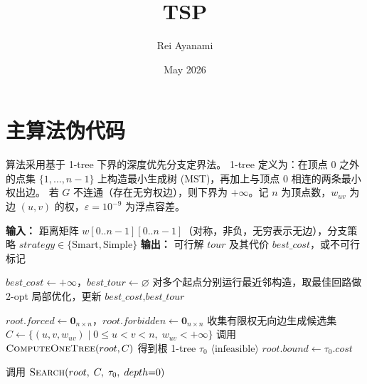 \documentclass{article}
\title{TSP}
\author{Rei Ayanami}
\date{May 2026}
\newenvironment{overflow}
  {\tcolorbox[breakable, colback=white, colframe=black, boxrule=0.5pt, arc=0pt,
              left=2pt, right=2pt, top=2pt, bottom=2pt]}
  {\endtcolorbox}
\begin{document}
\maketitle

\section{主算法伪代码}

算法采用基于 1-tree 下界的深度优先分支定界法。
1-tree 定义为：在顶点 $0$ 之外的点集 $\{1,\dots,n-1\}$ 上构造最小生成树 (MST)，再加上与顶点 $0$ 相连的两条最小权出边。
若 $G$ 不连通（存在无穷权边），则下界为 $+\infty$。记 $n$ 为顶点数，$w_{uv}$ 为边 $(u,v)$ 的权，$\varepsilon = 10^{-9}$ 为浮点容差。

\begin{overflow}
\begin{algorithm}[H]
\caption{基于 1-tree 下界的 DFS 分支定界 (BranchBoundSolver::solve)}
\label{alg:tsp-bb}
\begin{algorithmic}[1]

\State \textbf{输入：} 距离矩阵 $w[0..n{-}1][0..n{-}1]$（对称，非负，无穷表示无边），分支策略 $strategy \in \{\text{Smart}, \text{Simple}\}$
\State \textbf{输出：} 可行解 $\textit{tour}$ 及其代价 $\textit{best\_cost}$，或不可行标记

\Statex

\State $\textit{best\_cost} \gets +\infty$，$\textit{best\_tour} \gets \varnothing$
\State 对多个起点分别运行最近邻构造，取最佳回路做 2-opt 局部优化，更新 $\textit{best\_cost},\textit{best\_tour}$

\Statex

\State $root.\textit{forced} \gets \mathbf{0}_{n \times n}$，$root.\textit{forbidden} \gets \mathbf{0}_{n \times n}$
\State 收集有限权无向边生成候选集 $C \gets \{(u,v,w_{uv}) \mid 0 \le u < v < n,\; w_{uv} < +\infty\}$
\State 调用 $\textsc{ComputeOneTree}(root, C)$ 得到根 1-tree $\tau_0$
    \State \Return $\langle\text{infeasible}\rangle$
\EndIf
\State $root.\textit{bound} \gets \tau_0.\!\textit{cost}$

\Statex

\State 调用 $\textsc{Search}(root,\; C,\; \tau_0,\; depth{=}0)$


\end{algorithmic}
\end{algorithm}
\end{overflow}
\end{document}
